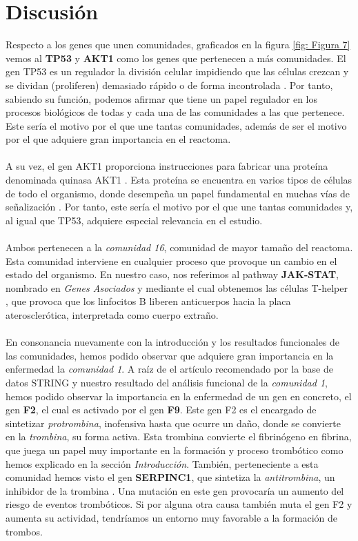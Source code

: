 \section{Discusión}
\hfill


\hfill

Respecto a los genes que unen comunidades, graficados en la figura \ref*{fig: Figura 7} vemos al \textbf{TP53} y \textbf{AKT1} como los genes que pertenecen a más comunidades. El gen TP53 es un regulador la división celular impidiendo que las células crezcan y se dividan (proliferen) demasiado rápido o de forma incontrolada \cite{TP53}. Por tanto, sabiendo su función, podemos afirmar que tiene un papel regulador en los procesos biológicos de todas y cada una de las comunidades a las que pertenece. Este sería el motivo por el que une tantas comunidades, además de ser el motivo por el que adquiere gran importancia en el reactoma.\\\\  A su vez, el gen AKT1 proporciona instrucciones para fabricar una proteína denominada quinasa AKT1 \cite{AKT1}. Esta proteína se encuentra en varios tipos de células de todo el organismo, donde desempeña un papel fundamental en muchas vías de señalización \cite{AKT1}. Por tanto, este sería el motivo por el que une tantas comunidades y, al igual que TP53, adquiere especial relevancia en el estudio.\\\\
Ambos pertenecen a la \textit{comunidad 16}, comunidad de mayor tamaño del reactoma. Esta comunidad interviene en cualquier proceso que provoque un cambio en el estado del organismo. En nuestro caso, nos referimos al pathway \textbf{JAK-STAT}, nombrado en \textit{Genes Asociados} y mediante el cual obtenemos las células T-helper \cite{pathway}, que provoca que los linfocitos B liberen anticuerpos hacia la placa aterosclerótica, interpretada como cuerpo extraño.\\\\
En consonancia nuevamente con la introducción y los resultados funcionales de las comunidades, hemos podido observar que adquiere gran importancia en la enfermedad la \textit{comunidad 1}. A raíz de el artículo recomendado \cite{F2_F9} por la base de datos STRING \cite{STRING}  y nuestro resultado del análisis funcional de la \textit{comunidad 1}, hemos podido observar la importancia en la enfermedad de un gen en concreto, el gen \textbf{F2}, el cual es activado por el gen \textbf{F9}. Este gen F2 es el encargado de sintetizar \textit{protrombina}, inofensiva hasta que ocurre un daño, donde se convierte en la \textit{trombina}, su forma activa. Esta trombina convierte el fibrinógeno en fibrina, que juega un papel muy importante en la formación y proceso trombótico como hemos explicado en la sección \textit{Introducción}. También, perteneciente a esta comunidad hemos visto el gen \textbf{SERPINC1}, que sintetiza la \textit{antitrombina}, un inhibidor de la trombina \cite{SERPINC1}. Una mutación en este gen provocaría un aumento del riesgo de eventos trombóticos. Si por alguna otra causa también muta el gen F2 y aumenta su actividad, tendríamos un entorno muy favorable a la formación de trombos.\\\\
